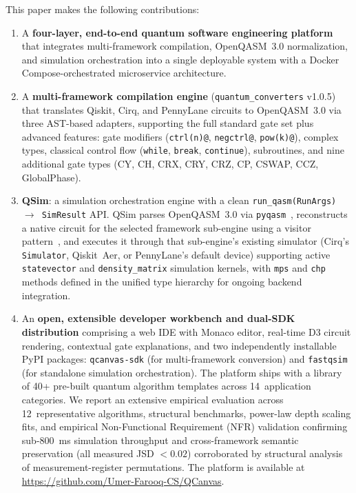 \documentclass[runningheads]{llncs}
\begin{document}
This paper makes the following contributions:
\begin{enumerate}
    \item A \textbf{four-layer, end-to-end quantum software engineering platform} that integrates multi-framework compilation, OpenQASM~3.0 normalization, and simulation orchestration into a single deployable system with a Docker Compose-orchestrated microservice architecture.
    \item A \textbf{multi-framework compilation engine} (\texttt{quantum\_converters} v1.0.5) that translates Qiskit, Cirq, and PennyLane circuits to OpenQASM~3.0 via three AST-based adapters, supporting the full standard gate set plus advanced features: gate modifiers (\texttt{ctrl(n)@}, \texttt{negctrl@}, \texttt{pow(k)@}), complex types, classical control flow (\texttt{while}, \texttt{break}, \texttt{continue}), subroutines, and nine additional gate types (CY, CH, CRX, CRY, CRZ, CP, CSWAP, CCZ, GlobalPhase).
    \item \textbf{QSim}: a simulation orchestration engine with a clean \texttt{run\_qasm(RunArgs) $\rightarrow$ SimResult} API. QSim parses OpenQASM~3.0 via \texttt{pyqasm}~\cite{pyqasm}, reconstructs a native circuit for the selected framework sub-engine using a visitor pattern~\cite{gamma1994}, and executes it through that sub-engine's existing simulator (Cirq's \texttt{Simulator}, Qiskit~Aer, or PennyLane's default device) supporting active \texttt{statevector} and \texttt{density\_matrix} simulation kernels, with \texttt{mps} and \texttt{chp} methods defined in the unified type hierarchy for ongoing backend integration.
    \item An \textbf{open, extensible developer workbench and dual-SDK distribution} comprising a web IDE with Monaco editor, real-time D3 circuit rendering, contextual gate explanations, and two independently installable PyPI packages: \texttt{qcanvas-sdk} (for multi-framework conversion) and \texttt{fastqsim} (for standalone simulation orchestration). The platform ships with a library of 40+ pre-built quantum algorithm templates across 14~application categories. We report an extensive empirical evaluation across 12~representative algorithms, structural benchmarks, power-law depth scaling fits, and empirical Non-Functional Requirement (NFR) validation confirming sub-800~ms simulation throughput and cross-framework semantic preservation (all measured JSD $< 0.02$) corroborated by structural analysis of measurement-register permutations. The platform is available at \url{https://github.com/Umer-Farooq-CS/QCanvas}.
\end{enumerate}
\end{document}
